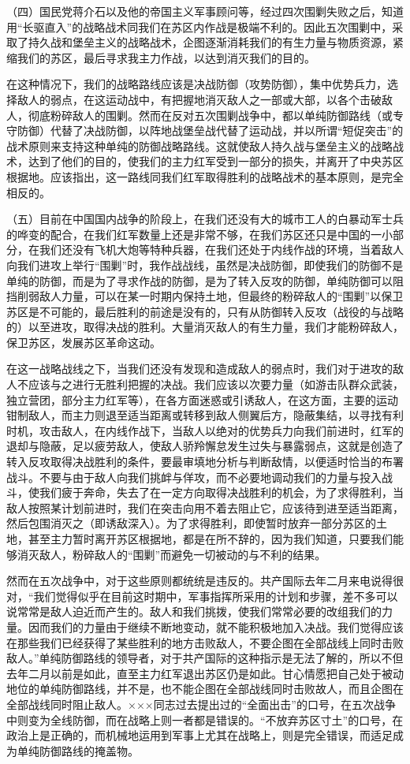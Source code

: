 （四）国民党蒋介石以及他的帝国主义军事顾问等，经过四次围剿失败之后，知道用“长驱直入”的战略战术同我们在苏区内作战是极端不利的。因此五次围剿中，采取了持久战和堡垒主义的战略战术，企图逐渐消耗我们的有生力量与物质资源，紧缩我们的苏区，最后寻求我主力作战，以达到消灭我们的目的。

在这种情况下，我们的战略路线应该是决战防御（攻势防御），集中优势兵力，选择敌人的弱点，在这运动战中，有把握地消灭敌人之一部或大部，以各个击破敌人，彻底粉碎敌人的围剿。然而在反对五次围剿战争中，都以单纯防御路线（或专守防御）代替了决战防御，以阵地战堡垒战代替了运动战，并以所谓“短促突击”的战术原则来支持这种单纯的防御战略路线。这就使敌人持久战与堡垒主义的战略战术，达到了他们的目的，使我们的主力红军受到一部分的损失，并离开了中央苏区根据地。应该指出，这一路线同我们红军取得胜利的战略战术的基本原则，是完全相反的。

（五）目前在中国国内战争的阶段上，在我们还没有大的城市工人的白暴动军士兵的哗变的配合，在我们红军数量上还是非常不够，在我们苏区还只是中国的一小部分，在我们还没有飞机大炮等特种兵器，在我们还处于内线作战的环境，当着敌人向我们进攻上举行“围剿”时，我作战战线，虽然是决战防御，即使我们的防御不是单纯的防御，而是为了寻求作战的防御，是为了转入反攻的防御，单纯防御可以阻挡削弱敌人力量，可以在某一时期内保持土地，但最终的粉碎敌人的“围剿”以保卫苏区是不可能的，最后胜利的前途是没有的，只有从防御转入反攻（战役的与战略的）以至进攻，取得决战的胜利。大量消灭敌人的有生力量，我们才能粉碎敌人，保卫苏区，发展苏区革命这动。

在这一战略战线之下，当我们还没有发现和造成敌人的弱点时，我们对于进攻的敌人不应该与之进行无胜利把握的决战。我们应该以次要力量（如游击队群众武装，独立营团，部分主力红军等），在各方面迷惑或引诱敌人，在这方面，主要的运动钳制敌人，而主力则退至适当距离或转移到敌人侧翼后方，隐蔽集结，以寻找有利时机，攻击敌人，在内线作战下，当敌人以绝对的优势兵力向我们前进时，红军的退却与隐蔽，足以疲劳敌人，使敌人骄羚懈怠发生过失与暴露弱点，这就是创造了转入反攻取得决战胜利的条件，要最审填地分析与判断敌情，以便适时恰当的布署战斗。不要与由于敌人向我们挑衅与佯攻，而不必要地调动我们的力量与投入战斗，使我们疲于奔命，失去了在一定方向取得决战胜利的机会，为了求得胜利，当敌人按照某计划前进时，我们在突击向用不着去阻止它，应该待到进至适当距离，然后包围消灭之（即诱敌深入）。为了求得胜利，即使暂时放弃一部分苏区的土地，甚至主力暂时离开苏区根据地，都是在所不辞的，因为我们知道，只要我们能够消灭敌人，粉碎敌人的“围剿”而避免一切被动的与不利的结果。

然而在五次战争中，对于这些原则都统统是违反的。共产国际去年二月来电说得很对，“我们觉得似乎在目前这时期中，军事指挥所采用的计划和步骤，差不多可以说常常是敌人迫近而产生的。敌人和我们挑拨，使我们常常必要的改组我们的力量。因而我们的力量由于继续不断地变动，就不能积极地加入决战。我们觉得应该在那些我们已经获得了某些胜利的地方击败敌人，不要企图在全部战线上同时击败敌人。”单纯防御路线的领导者，对于共产国际的这种指示是无法了解的，所以不但去年二月以前是如此，直至主力红军退出苏区仍是如此。甘心情愿把自己处于被动地位的单纯防御路线，并不是，也不能企图在全部战线同时击败故人，而且企图在全部战线同时阻止敌人。×××同志过去提出过的“全面出击”的口号，在五次战争中则变为全线防御，而在战略上则一者都是错误的。“不放弃苏区寸土”的口号，在政治上是正确的，而机械地运用到军事上尤其在战略上，则是完全错误，而适足成为单纯防御路线的掩盖物。


